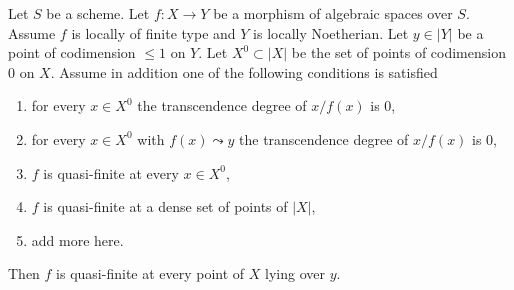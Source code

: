 \begin{lemma}
\label{lemma-quasi-finite-in-codim-1}
Let $S$ be a scheme. Let $f : X \to Y$ be a morphism of algebraic spaces
over $S$. Assume $f$ is locally of finite type and $Y$ is locally Noetherian.
Let $y \in |Y|$ be a point of codimension $\leq 1$ on $Y$.
Let $X^0 \subset |X|$ be the set of points of codimension $0$ on $X$.
Assume in addition one of the following conditions is satisfied
\begin{enumerate}
\item for every $x \in X^0$ the transcendence degree of $x/f(x)$ is $0$,
\item for every $x \in X^0$ with $f(x) \leadsto y$
the transcendence degree of $x/f(x)$ is $0$,
\item $f$ is quasi-finite at every $x \in X^0$,
\item $f$ is quasi-finite at a dense set of points of $|X|$,
\item add more here.
\end{enumerate}
Then $f$ is quasi-finite at every point of $X$ lying over $y$.
\end{lemma}


